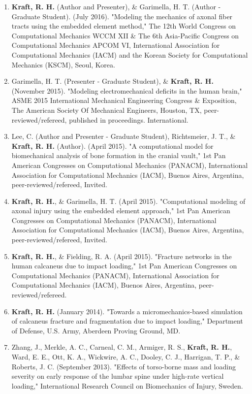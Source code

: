 \documentclass[a4paper,10pt]{article}
\begin{document}
\begin{enumerate}
  \item \textbf{\textbf{Kraft,} R. H.} (Author and Presenter), \&
 Garimella, H. T. (Author - Graduate Student). (July 2016). "Modeling the mechanics of axonal fiber tracts using the embedded element method," The 12th World Congress on Computational Mechanics WCCM XII \&
 The 6th Asia-Pacific Congress on Computational Mechanics APCOM VI, International Association for Computational Mechanics (IACM) and the Korean Society for Computational Mechanics (KSCM), Seoul, Korea.
  \item Garimella, H. T. (Presenter - Graduate Student), \&
 \textbf{\textbf{Kraft,} R. H.} (November 2015). "Modeling electromechanical deficits in the human brain," ASME 2015 International Mechanical Engineering Congress \&
 Exposition, The American Society Of Mechanical Engineers, Houston, TX, peer-reviewed/refereed, published in proceedings. International.
  \item Lee, C. (Author and Presenter - Graduate Student), Richtsmeier, J. T., \&
 \textbf{\textbf{Kraft,} R. H.} (Author). (April 2015). "A computational model for biomechanical analysis of bone formation in the cranial vault," 1st Pan American Congresses on Computational Mechanics (PANACM), International Association for Computational Mechanics (IACM), Buenos Aires, Argentina, peer-reviewed/refereed, Invited.
  \item \textbf{\textbf{Kraft,} R. H.}, \&
 Garimella, H. T. (April 2015). "Computational modeling of axonal injury using the embedded element approach," 1st Pan American Congresses on Computational Mechanics (PANACM), International Association for Computational Mechanics (IACM), Buenos Aires, Argentina, peer-reviewed/refereed, Invited.
  \item \textbf{\textbf{Kraft,} R. H.}, \&
 Fielding, R. A. (April 2015). "Fracture networks in the human calcaneus due to impact loading," 1st Pan American Congresses on Computational Mechanics (PANACM), International Association for Computational Mechanics (IACM), Buenos Aires, Argentina, peer-reviewed/refereed.
  \item \textbf{\textbf{Kraft,} R. H.} (January 2014). "Towards a micromechanics-based simulation of calcaneus fracture and fragmentation due to impact loading," Department of Defense, U.S. Army, Aberdeen Proving Ground, MD.
  \item Zhang, J., Merkle, A. C., Carneal, C. M., Armiger, R. S., \textbf{\textbf{Kraft,} R. H.}, Ward, E. E., Ott, K. A., Wickwire, A. C., Dooley, C. J., Harrigan, T. P., \&
 Roberts, J. C. (September 2013). "Effects of torso-borne mass and loading severity on early response of the lumbar spine under high-rate vertical loading," International Research Council on Biomechanics of Injury, Sweden.

\end{enumerate}
\end{document}
